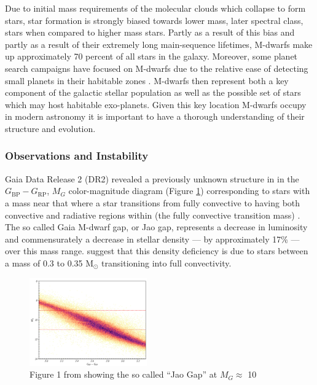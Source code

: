 Due to initial mass requirements of the molecular clouds which collapse to form
stars, star formation is strongly biased towards lower mass, later spectral
class, stars when compared to higher mass stars. Partly as a result of this
bias and partly as a result of their extremely long main-sequence lifetimes,
M-dwarfs make up approximately 70 percent of all stars in the galaxy.
Moreover, some planet search campaigns have focused on M-dwarfs due to the
relative ease of detecting small planets in their habitable zones
\citep[e.g.][]{Nut08}. M-dwarfs then represent both a key component of the
galactic stellar population as well as the possible set of stars which may host
habitable exo-planets. Given this key location M-dwarfs occupy in modern
astronomy it is important to have a thorough understanding of their structure
and evolution.

\subsubsection{Observations and Instability}
Gaia Data Release 2 (DR2) revealed a previously unknown structure in in the
$G_{\text{BP}}-G_{\text{RP}}$, $M_{G}$ color-magnitude diagram (Figure \ref{fig:JaoGap}) corresponding to
stars with a mass near that where a star transitions from fully convective
to having both convective and radiative regions within (the fully convective
transition mass) \citep{Jao2018}. The so called Gaia M-dwarf gap, or Jao gap,
represents a decrease in luminosity and commensurately a decrease in stellar
density --- by approximately 17\% --- over this mass range.
\citet{Jao2018,Baraffe2018} suggest that this density deficiency is due to
stars between a mass of 0.3 to 0.35 M$_{\odot}$ transitioning into full
convectivity.

\begin{figure}
	\centering
	\includegraphics[width=0.45\textwidth]{src/Figures/JaoGap.png}
	\caption{Figure 1 from \citet{Jao2018} showing the so called ``Jao Gap'' at
	$M_{G}\approx$ 10}
	\label{fig:JaoGap}
\end{figure}

